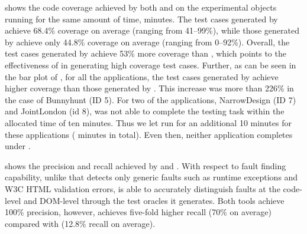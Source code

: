  shows the code coverage achieved by  both \jseft and \artemis on the experimental objects running for the same amount of time,  minutes.
The test cases generated by \jseft achieve 68.4\% coverage on average (ranging from 41--99\%), while those generated by \artemis achieve only 44.8\% coverage on average (ranging from 0--92\%).
Overall, the test cases generated by \jseft achieve 53\% more coverage than \artemis, which points to the effectiveness of \jseft in generating high coverage test cases. 
Further, as can be seen in the bar plot of , for all the applications, the test cases generated by \jseft achieve higher coverage than those generated by \artemis. 
This increase was more than 226\% in the case of Bunnyhunt (ID 5). %
For two of the applications, NarrowDesign (ID 7) and JointLondon (id 8), \artemis was not able to complete the testing task within the allocated time of ten minutes.
Thus we let \artemis run for an additional 10 minutes for these applications ( minutes in total). Even then, neither application completes under \artemis. 

 shows the precision and recall achieved by \jseft and \artemis.
With respect to fault finding capability, unlike \artemis that detects only generic faults such as runtime exceptions and W3C HTML validation errors, \jseft is able to accurately distinguish faults at the code-level and DOM-level through the test oracles it generates. Both tools achieve 100\% precision, however, \jseft achieves five-fold higher recall (70\% on average) compared with \artemis (12.8\% recall on average). %
